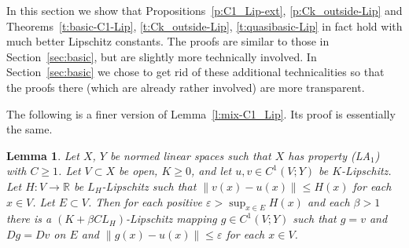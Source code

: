 \documentclass[a4paper,twoside,10pt,reqno,draft]{amsart}
\newtheorem{lemma}[theorem]{Lemma}
\theoremstyle{definition}
\theoremstyle{remark}
\newcommand\norm[1]{\mathopen\|#1\mathclose\|}
\newcommand\ve{\varepsilon}
\newcommand\R{{\mathbb R}}
\newcommand\pLA[1]{(LA$_#1$)}
\begin{document}
In this section we show that Propositions~\ref{p:C1_Lip-ext}, \ref{p:Ck_outside-Lip} and Theorems~\ref{t:basic-C1-Lip}, \ref{t:Ck_outside-Lip}, \ref{t:quasibasic-Lip} in fact hold with much better Lipschitz constants.
The proofs are similar to those in Section~\ref{sec:basic}, but are slightly more technically involved.
In Section~\ref{sec:basic} we chose to get rid of these additional technicalities so that the proofs there (which are already rather involved) are more transparent.

The following is a finer version of Lemma~\ref{l:mix-C1_Lip}.
Its proof is essentially the same.
\begin{lemma}\label{l:mix-C1_Lip2}
Let $X$, $Y$ be normed linear spaces such that $X$ has property \pLA1 with $C\ge1$.
Let $V\subset X$ be open, $K\ge0$, and let $u,v\in C^1(V;Y)$ be $K$-Lipschitz.
Let $H\colon V\to\R$ be $L_H$-Lipschitz such that $\norm{v(x)-u(x)}\le H(x)$ for each $x\in V$.
Let $E\subset V$.
Then for each positive $\ve>\sup_{x\in E}H(x)$ and each $\beta>1$ there is a $(K+\beta CL_H)$-Lipschitz mapping $g\in C^1(V;Y)$ such that $g=v$ and $Dg=Dv$ on $E$ and $\norm{g(x)-u(x)}\le\ve$ for each $x\in V$.
\end{lemma}
\end{document}
